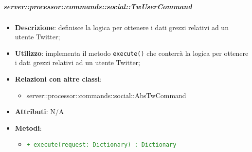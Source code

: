        \subparagraph{server::processor::commands::social::TwUserCommand} %
        \label{subp:bdsm_app_server_processor_commands_social_twusercommand}
        \begin{itemize}
          \item \textbf{Descrizione}: definisce la logica per ottenere i dati grezzi relativi ad un utente Twitter;
          \item \textbf{Utilizzo}: implementa il metodo \texttt{execute()} che conterrà la logica per ottenere i dati grezzi relativi ad un utente Twitter;
          \item \textbf{Relazioni con altre classi}:
            \begin{itemize}
              \item server::processor::commands::social::AbsTwCommand
            \end{itemize}
          \item \textbf{Attributi}: N/A
          \item \textbf{Metodi}:
          \begin{itemize}
              \item \textcolor{forestgreen}{\texttt{+ execute(request: Dictionary) : Dictionary}}
          \end{itemize}
        \end{itemize}


